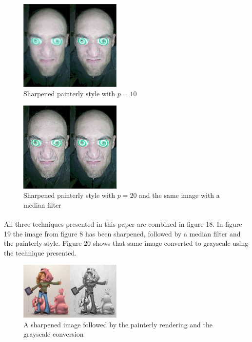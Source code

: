 \documentclass[10pt,twocolumn]{article}
\begin{document}
\begin{figure}
\centering
\includegraphics[width=0.45\textwidth]{sharppaint10.jpg}
\caption{Sharpened painterly style with $p=10$}
\end{figure}
\begin{figure}
\centering
\includegraphics[width=0.45\textwidth]{medianpaint.jpg}
\caption{Sharpened painterly style with $p=20$ and the same image with a median filter}
\end{figure}

	\paragraph{} All three techniques presented in this paper are combined in figure 18.  In figure 19 the image from figure 8 has been sharpened, followed by a median filter and the painterly style.  Figure 20 shows that same image converted to grayscale using the technique presented.

\begin{figure}
\centering
\includegraphics[width=0.45\textwidth]{all3.jpg}
\caption{A sharpened image followed by the painterly rendering and the grayscale conversion}
\end{figure}
\end{document}
